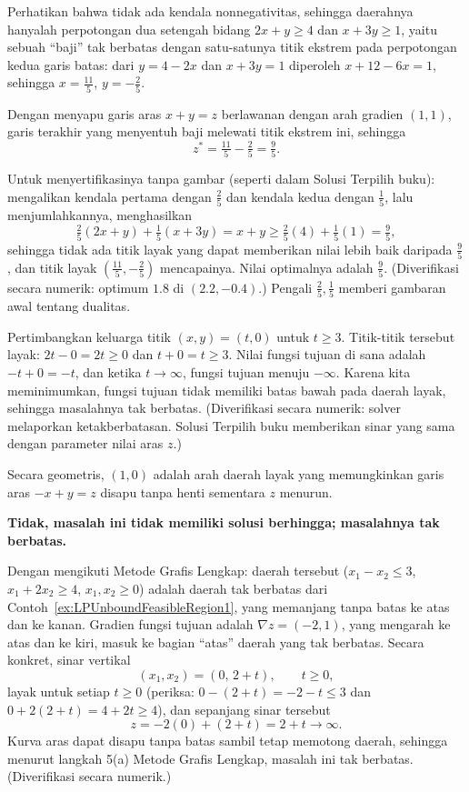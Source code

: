 Perhatikan bahwa tidak ada kendala nonnegativitas, sehingga daerahnya hanyalah perpotongan dua setengah bidang $2x + y \geq 4$ dan $x + 3y \geq 1$, yaitu sebuah ``baji'' tak berbatas dengan satu-satunya titik ekstrem pada perpotongan kedua garis batas: dari $y = 4 - 2x$ dan $x + 3y = 1$ diperoleh $x + 12 - 6x = 1$, sehingga $x = \tfrac{11}{5}$, $y = -\tfrac{2}{5}$.

Dengan menyapu garis aras $x + y = z$ berlawanan dengan arah gradien $(1,1)$, garis terakhir yang menyentuh baji melewati titik ekstrem ini, sehingga
\[
z^* = \tfrac{11}{5} - \tfrac{2}{5} = \tfrac{9}{5}.
\]

Untuk menyertifikasinya tanpa gambar (seperti dalam Solusi Terpilih buku): mengalikan kendala pertama dengan $\tfrac{2}{5}$ dan kendala kedua dengan $\tfrac{1}{5}$, lalu menjumlahkannya, menghasilkan
\[
\tfrac{2}{5}(2x + y) + \tfrac{1}{5}(x + 3y) = x + y \geq \tfrac{2}{5}(4) + \tfrac{1}{5}(1) = \tfrac{9}{5},
\]
sehingga tidak ada titik layak yang dapat memberikan nilai lebih baik daripada $\tfrac{9}{5}$, dan titik layak $(\tfrac{11}{5}, -\tfrac{2}{5})$ mencapainya. Nilai optimalnya adalah $\tfrac{9}{5}$. (Diverifikasi secara numerik: optimum $1.8$ di $(2.2, -0.4)$.) Pengali $\tfrac25, \tfrac15$ memberi gambaran awal tentang dualitas.

Pertimbangkan keluarga titik $(x, y) = (t, 0)$ untuk $t \geq 3$. Titik-titik tersebut layak: $2t - 0 = 2t \geq 0$ dan $t + 0 = t \geq 3$. Nilai fungsi tujuan di sana adalah $-t + 0 = -t$, dan ketika $t \to \infty$, fungsi tujuan menuju $-\infty$. Karena kita meminimumkan, fungsi tujuan tidak memiliki batas bawah pada daerah layak, sehingga masalahnya tak berbatas. (Diverifikasi secara numerik: solver melaporkan ketakberbatasan. Solusi Terpilih buku memberikan sinar yang sama dengan parameter nilai aras $z$.)

Secara geometris, $(1,0)$ adalah arah daerah layak yang memungkinkan garis aras $-x + y = z$ disapu tanpa henti sementara $z$ menurun.

\textbf{Tidak, masalah ini tidak memiliki solusi berhingga; masalahnya tak berbatas.}

Dengan mengikuti Metode Grafis Lengkap: daerah tersebut ($x_1 - x_2 \leq 3$, $x_1 + 2x_2 \geq 4$, $x_1, x_2 \geq 0$) adalah daerah tak berbatas dari Contoh~\ref{ex:LPUnboundFeasibleRegion1}, yang memanjang tanpa batas ke atas dan ke kanan. Gradien fungsi tujuan adalah $\nabla z = (-2, 1)$, yang mengarah ke atas dan ke kiri, masuk ke bagian ``atas'' daerah yang tak berbatas. Secara konkret, sinar vertikal
\[
(x_1, x_2) = (0,\, 2 + t), \qquad t \geq 0,
\]
layak untuk setiap $t \geq 0$ (periksa: $0 - (2+t) = -2 - t \leq 3$ dan $0 + 2(2+t) = 4 + 2t \geq 4$), dan sepanjang sinar tersebut
\[
z = -2(0) + (2 + t) = 2 + t \longrightarrow \infty.
\]
Kurva aras dapat disapu tanpa batas sambil tetap memotong daerah, sehingga menurut langkah 5(a) Metode Grafis Lengkap, masalah ini tak berbatas. (Diverifikasi secara numerik.)


